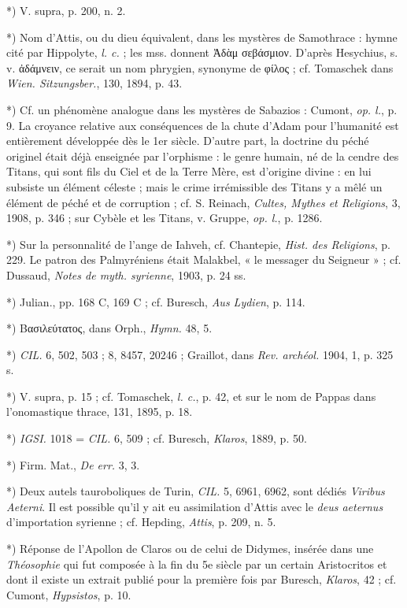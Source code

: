 \documentclass[a4paper, 11pt, oneside, polutonikogreek, french]{article}
\begin{document}
*) V. supra, p. 200, n. 2.

*) Nom d'Attis, ou du dieu équivalent, dans les mystères de Samothrace : hymne cité par Hippolyte, \emph{l. c.} ; les mss. donnent Ἀδὰμ σεβάσμιον. D'après Hesychius, s. v. ἀδάμνειν, ce serait un nom phrygien, synonyme de φίλος ; cf. Tomaschek dans \emph{Wien. Sitzungsber.}, 130, 1894, p. 43.

*) Cf. un phénomène analogue dans les mystères de Sabazios : Cumont, \emph{op. l.}, p. 9. La croyance relative aux conséquences de la chute d'Adam pour l'humanité est entièrement développée dès le 1er siècle. D'autre part, la doctrine du péché originel était déjà enseignée par l'orphisme : le genre humain, né de la cendre des Titans, qui sont fils du Ciel et de la Terre Mère, est d'origine divine : en lui subsiste un élément céleste ; mais le crime irrémissible des Titans y a mêlé un élément de péché et de corruption ; cf. S. Reinach, \emph{Cultes, Mythes et Religions}, 3, 1908, p. 346 ; sur Cybèle et les Titans, v. Gruppe, \emph{op. l.}, p. 1286.

*) Sur la personnalité de l'ange de Iahveh, cf. Chantepie, \emph{Hist. des Religions}, p. 229. Le patron des Palmyréniens était Malakbel, « le messager du Seigneur » ; cf. Dussaud, \emph{Notes de myth. syrienne}, 1903, p. 24 ss.

*) Julian., pp. 168 C, 169 C ; cf. Buresch, \emph{Aus Lydien}, p. 114.

*) Βασιλεύτατος, dans Orph., \emph{Hymn.} 48, 5.

*) \emph{CIL.} 6, 502, 503 ; 8, 8457, 20246 ; Graillot, dans \emph{Rev. archéol.} 1904, 1, p. 325 s.

*) V. supra, p. 15 ; cf. Tomaschek, \emph{l. c.}, p. 42, et sur le nom de Pappas dans l'onomastique thrace, 131, 1895, p. 18.

*) \emph{IGSI.} 1018 = \emph{CIL.} 6, 509 ; cf. Buresch, \emph{Klaros}, 1889, p. 50.

*) Firm. Mat., \emph{De err.} 3, 3.

*) Deux autels tauroboliques de Turin, \emph{CIL.} 5, 6961, 6962, sont dédiés \emph{Viribus Aeterni}. Il est possible qu'il y ait eu assimilation d'Attis avec le \emph{deus aeternus} d'importation syrienne ; cf. Hepding, \emph{Attis}, p. 209, n. 5.

*) Réponse de l'Apollon de Claros ou de celui de Didymes, insérée dans une \emph{Théosophie} qui fut composée à la fin du 5e siècle par un certain Aristocritos et dont il existe un extrait publié pour la première fois par Buresch, \emph{Klaros}, 42 ; cf. Cumont, \emph{Hypsistos}, p. 10.
\end{document}
